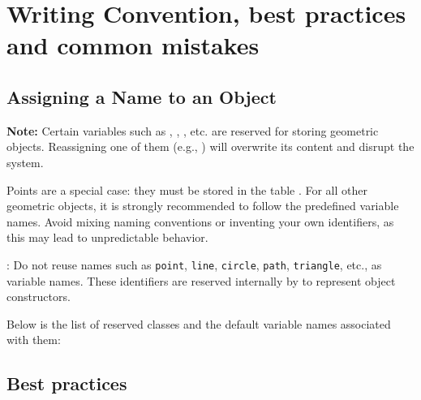 \newpage

\section{Writing Convention, best practices and common mistakes} %
\label{sec:writing_convention}
\subsection{Assigning a Name to an Object} %
\label{sub:assigning_a_name_to_an_object}

\textbf{Note:} Certain variables such as , , , etc. are reserved for storing geometric objects.
Reassigning one of them (e.g., ) will overwrite its content and disrupt the system.

Points are a special case: they must be stored in the table .
For all other geometric objects, it is strongly recommended to follow the predefined variable names.
Avoid mixing naming conventions or inventing your own identifiers, as this may lead to unpredictable behavior.

\vspace{1em}
\tkzRHand{\textcolor{red}{Warning}}: Do not reuse names such as \texttt{point}, \texttt{line}, \texttt{circle}, \texttt{path}, \texttt{triangle}, etc., as variable names.
These identifiers are reserved internally by  to represent object constructors.

\vspace{1em}
Below is the list of reserved classes and the default variable names associated with them:
\label{list of reserved classes}

\vspace{1em}
\textcolor{red}{ }

\subsection{Best practices} %
\label{sub:best_practices}

